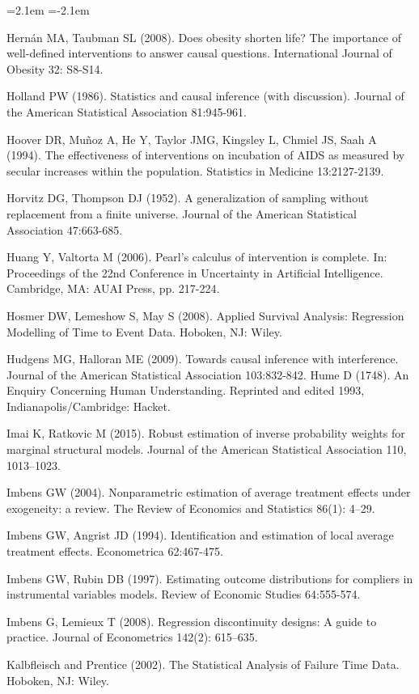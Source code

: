 \begin{list}{}{\leftmargin=2.1em   \itemindent=-2.1em \parsep=0pt \itemsep=1.6pt \topsep=4pt \rightmargin=0pt}
\item Hernán MA, Taubman SL (2008). Does obesity shorten life? The importance of well-defined interventions to answer causal questions. International Journal of Obesity 32: S8-S14.
\item Holland PW (1986). Statistics and causal inference (with discussion). Journal of the American Statistical Association 81:945-961.
\item Hoover DR, Muñoz A, He Y, Taylor JMG, Kingsley L, Chmiel JS, Saah A (1994). The effectiveness of interventions on incubation of AIDS as measured by secular increases within the population. Statistics in Medicine 13:2127-2139.
\item Horvitz DG, Thompson DJ (1952). A generalization of sampling without replacement from a finite universe. Journal of the American Statistical Association 47:663-685.
\item Huang Y, Valtorta M (2006). Pearl's calculus of intervention is complete. In: Proceedings of the 22nd Conference in Uncertainty in Artificial Intelligence. Cambridge, MA: AUAI Press, pp. 217-224.
\item Hosmer DW, Lemeshow S, May S (2008). Applied Survival Analysis: Regression Modelling of Time to Event Data. Hoboken, NJ: Wiley.
\item Hudgens MG, Halloran ME (2009). Towards causal inference with interference. Journal of the American Statistical Association 103:832-842. Hume D (1748). An Enquiry Concerning Human Understanding. Reprinted and edited 1993, Indianapolis/Cambridge: Hacket.
\item Imai K, Ratkovic M (2015). Robust estimation of inverse probability weights for marginal structural models. Journal of the American Statistical Association 110, 1013–1023.
\item Imbens GW (2004). Nonparametric estimation of average treatment effects under exogeneity: a review. The Review of Economics and Statistics 86(1): 4–29.
\item Imbens GW, Angrist JD (1994). Identification and estimation of local average treatment effects. Econometrica 62:467-475.
\item Imbens GW, Rubin DB (1997). Estimating outcome distributions for compliers in instrumental variables models. Review of Economic Studies 64:555-574.
\item Imbens G, Lemieux T (2008). Regression discontinuity designs: A guide to practice. Journal of Econometrics 142(2): 615–635.
\item Kalbfleisch and Prentice (2002). The Statistical Analysis of Failure Time Data. Hoboken, NJ: Wiley.

\end{list}
